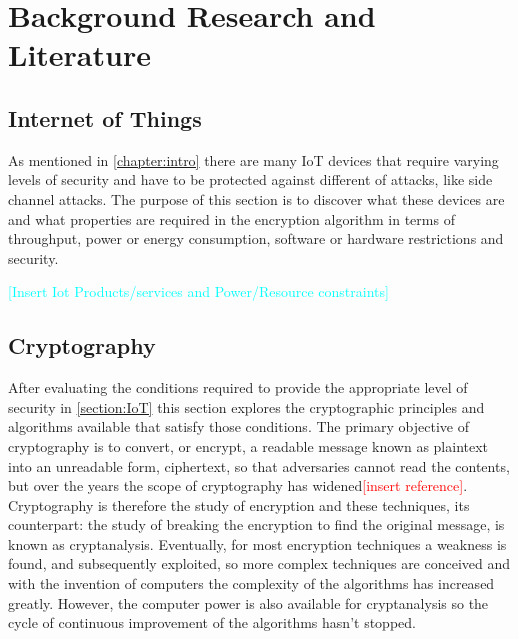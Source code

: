 \documentclass[12pt,twoside,a4paper]{report}
\begin{document}
    \chapter{Background Research and Literature}
    \label{chapter:research}
    
    \section{Internet of Things}
    \label{section:IoT}
    As mentioned in \autoref{chapter:intro} there are many IoT devices that require varying levels of security and have to be protected against different of attacks, like side channel attacks. The purpose of this section is to discover what these devices are and what properties are required in the encryption algorithm in terms of throughput, power or energy consumption, software or hardware restrictions and security.
    
    \textcolor{cyan}{[Insert Iot Products/services and Power/Resource constraints]}
    
    \section{Cryptography}
    After evaluating the conditions required to provide the appropriate level of security  in \autoref{section:IoT} this section explores the cryptographic principles and algorithms available that satisfy those conditions.
    The primary objective of cryptography is to convert, or encrypt, a readable message known as plaintext into an unreadable form, ciphertext, so that adversaries cannot read the contents,  but over the years the scope of cryptography has widened\textcolor{red}{[insert reference]}.
    Cryptography is therefore the study of encryption and these techniques, its counterpart: the study of breaking the encryption to find the original message, is known as cryptanalysis.
    Eventually, for most encryption techniques a weakness is found, and subsequently exploited, so more complex techniques are conceived and with the invention of computers the complexity of the algorithms has increased greatly.
    However, the computer power is also available for cryptanalysis so the cycle of continuous improvement of the algorithms hasn't stopped.
    
\end{document}
